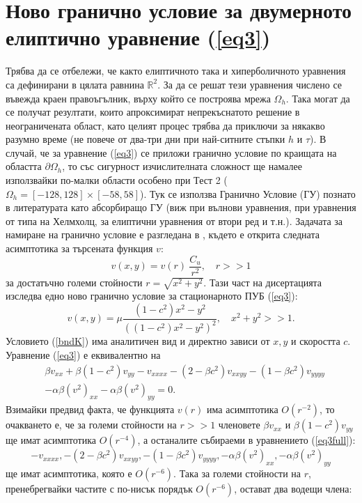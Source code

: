 \documentclass{article}
\newcommand{\be}{\begin{equation}}
\newcommand{\ee}{\end{equation}}
\newcommand{\rf}[1]{(\ref{#1})}
\newcommand{\RR}{\mathbb{R}}
\begin{document}
\section{Ново гранично условие за двумерното елиптично уравнение \rf{eq3}}
Трябва да се отбележи, че както елиптичното така и хиперболичното уравнения са дефинирани в цялата равнина $\RR^2$. За да се решат тези уравнения числено се въвежда краен правоъгълник, върху който се построява мрежа $\Omega_h$. Така могат да се получат резултати, които апроксимират непрекъснатото решение в неограничената област, като целият процес трябва да приключи за някакво разумно време (не повече от два-три дни при най-ситните стъпки $h$ и $\tau$). В случай, че за уравнение \rf{eq3} се приложи гранично условие по краищата на областта $\partial \Omega_h$, то със сигурност изчислителната сложност ще намалее използвайки по-малки области особено при Тест 2 ($\Omega_h = [-128, 128] \times [-58, 58]$). Тук се използва Гранично Условие (ГУ) познато в литературата като абсорбиращо ГУ (виж \cite{ref16} при вълнови уравнения, \cite{ref31} при уравнения от типа на Хелмхолц, \cite{ref32} за елиптични уравнения от втори ред и т.н.). Задачата за намиране на гранично условие е разгледана в \cite{ref116}, където е открита следната асимптотика за търсената функция $v$:
\be
v(x,y) = v(r) ~ \frac{C_u}{r^2}, \quad r>>1
\ee
за достатъчно големи стойности $r = \sqrt{x^2 + y^2}$. Тази част на дисертацията изследва едно ново гранично условие за стационарното ПУБ \rf{eq3}:
\be\label{bndK}
v(x,y) = \mu \frac{ (1-c^2)x^2 - y^2}{ ((1-c^2)x^2 - y^2)^2}, \quad x^2 + y^2 >> 1.
\ee
Условието \rf{bndK} има аналитичен вид и директно зависи от $x,y$ и скоростта $c$. Уравнение \rf{eq3} е еквивалентно на 
\begin{align}\label{eq3full}
&\beta v_{xx} + \beta (1-c^2) v_{yy} - v_{xxxx} - (2-\beta c^2)v_{xxyy} - (1-\beta c^2)v_{yyyy} \nonumber \\ 
&- \alpha \beta (v^2)_{xx} - \alpha \beta (v^2)_{yy}  =0.
\end{align}
Взимайки предвид факта, че функцията $v(r)$ има асимптотика $O(r^{-2})$, то очакването е, че за големи стойности на $r >> 1$ членовете $\beta v_{xx}$ и $\beta (1-c^2) v_{yy}$ ще имат асимптотика $O(r^{-4})$, а останалите събираеми в уравнението \rf{eq3full}:
\be
- v_{xxxx},  - (2-\beta c^2)v_{xxyy},  - (1-\beta c^2)v_{yyyy}, - \alpha \beta (v^2)_{xx}, - \alpha \beta (v^2)_{yy}
\ee
ще имат асимптотика, която е $O(r^{-6})$. Така за големи стойности на $r$, пренебрегвайки частите с по-нисък порядък $O(r^{-6})$,
остават два водещи члена:
\end{document}
